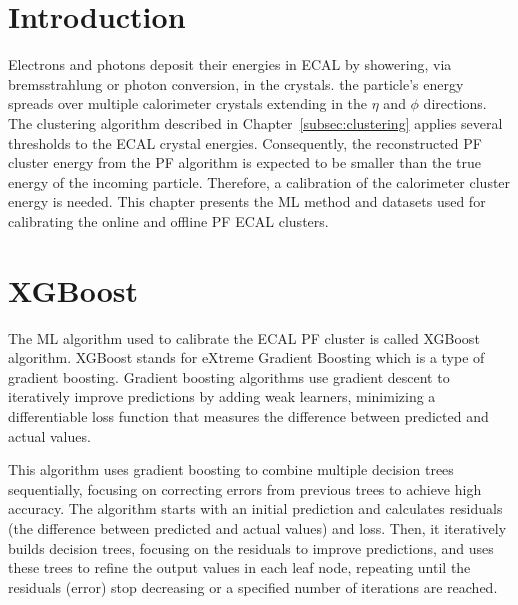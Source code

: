 
\section{Introduction}
Electrons and photons deposit their energies in ECAL by showering, via bremsstrahlung or photon conversion, in the crystals.
the particle's energy spreads over multiple calorimeter crystals extending in the $\eta$ and $\phi$ directions.
The clustering algorithm described in Chapter~\ref{subsec:clustering} applies several thresholds to the ECAL crystal energies. Consequently,
the reconstructed PF cluster energy from the PF algorithm is expected to be smaller than the true energy of the incoming particle.
Therefore, a calibration of the calorimeter cluster energy is needed.
This chapter presents the ML method and datasets used for calibrating the online and offline PF ECAL clusters.

\section{XGBoost} %

The ML algorithm used to calibrate the ECAL PF cluster is called XGBoost algorithm.
XGBoost stands for eXtreme Gradient Boosting which is a type of gradient boosting.
Gradient boosting algorithms use gradient descent to iteratively improve predictions by adding weak learners, minimizing a differentiable loss function that measures the difference between predicted and actual values.

This algorithm
uses gradient boosting to combine multiple decision trees sequentially, focusing on correcting errors from previous trees to achieve high accuracy.
The algorithm starts with an initial prediction and calculates residuals (the difference between predicted and actual values) and loss.
Then, it iteratively builds decision trees, focusing on the residuals to improve predictions, and uses these trees to refine the output values in each leaf node, repeating until the residuals (error) stop decreasing or a specified number of iterations are reached.


